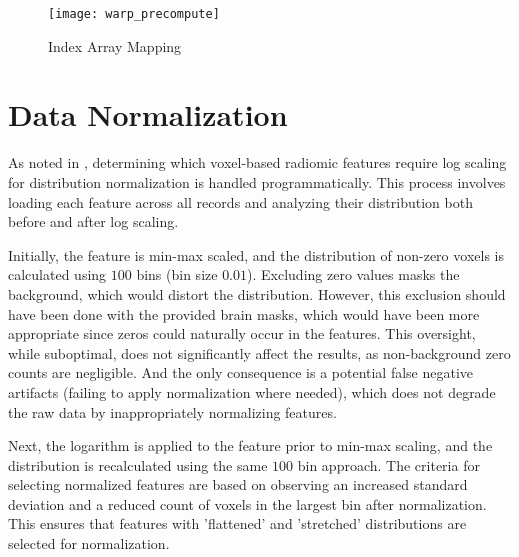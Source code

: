 \begin{figure}[H]
\centering
\texttt{[image: warp\_precompute]}
\caption{Index Array Mapping}
\end{figure}

\section{Data Normalization}
\label{app:imp-norm}

As noted in , determining which voxel-based radiomic features require log scaling for distribution normalization is handled programmatically. This process involves loading each feature across all records and analyzing their distribution both before and after log scaling.\par
Initially, the feature is min-max scaled, and the distribution of non-zero voxels is calculated using $100$ bins (bin size $0.01$). Excluding zero values masks the background, which would distort the distribution. However, this exclusion should have been done with the provided brain masks, which would have been more appropriate since zeros could naturally occur in the features. This oversight, while suboptimal, does not significantly affect the results, as non-background zero counts are negligible. And the only consequence is a potential false negative artifacts (failing to apply normalization where needed), which does not degrade the raw data by inappropriately normalizing features.\par
Next, the logarithm is applied to the feature prior to min-max scaling, and the distribution is recalculated using the same $100$ bin approach. The criteria for selecting normalized features are based on observing an increased standard deviation and a reduced count of voxels in the largest bin after normalization. This ensures that features with 'flattened' and 'stretched' distributions are selected for normalization.







